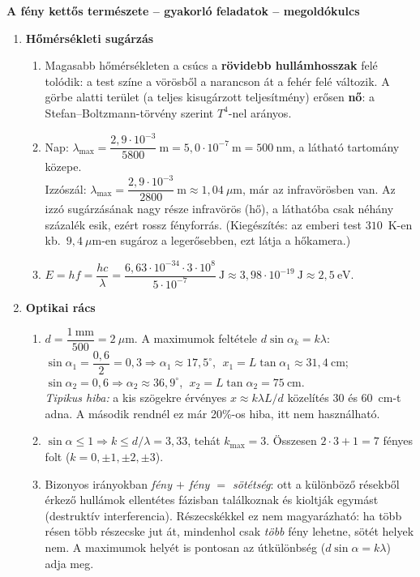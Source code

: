 \documentclass[11pt,a4paper]{article}
\begin{document}
\begin{center}
  {\Large\bfseries A fény kettős természete -- gyakorló feladatok -- megoldókulcs}
\end{center}

\begin{enumerate}
\item \textbf{Hőmérsékleti sugárzás}
  \begin{enumerate}
    \item Magasabb hőmérsékleten a csúcs a \textbf{rövidebb hullámhosszak} felé tolódik:
      a test színe a vörösből a narancson át a fehér felé változik. A görbe alatti
      terület (a teljes kisugárzott teljesítmény) erősen \textbf{nő}: a
      Stefan--Boltzmann-törvény szerint $T^4$-nel arányos.
    \item Nap: $\lambda_\text{max} = \dfrac{2{,}9\cdot 10^{-3}}{5800}~\text{m} =
      5{,}0\cdot 10^{-7}~\text{m} = 500~\text{nm}$, a látható tartomány közepe.\\
      Izzószál: $\lambda_\text{max} = \dfrac{2{,}9\cdot 10^{-3}}{2800}~\text{m} \approx
      1{,}04~\mu\text{m}$, már az infravörösben van. Az izzó sugárzásának nagy része
      infravörös (hő), a láthatóba csak néhány százalék esik, ezért rossz fényforrás.
      (Kiegészítés: az emberi test $310$~K-en kb.\ $9{,}4~\mu\text{m}$-en sugároz a
      legerősebben, ezt látja a hőkamera.)
    \item $E = hf = \dfrac{hc}{\lambda} = \dfrac{6{,}63\cdot 10^{-34}\cdot 3\cdot 10^8}
      {5\cdot 10^{-7}}~\text{J} \approx 3{,}98\cdot 10^{-19}~\text{J} \approx
      2{,}5~\text{eV}$.
  \end{enumerate}

\item \textbf{Optikai rács}
  \begin{enumerate}
    \item $d = \dfrac{1~\text{mm}}{500} = 2~\mu\text{m}$. A maximumok feltétele
      $d\sin\alpha_k = k\lambda$:\\
      $\sin\alpha_1 = \dfrac{0{,}6}{2} = 0{,}3 \Rightarrow \alpha_1 \approx 17{,}5^\circ$,
      $\;x_1 = L\tan\alpha_1 \approx 31{,}4~\text{cm}$;\\
      $\sin\alpha_2 = 0{,}6 \Rightarrow \alpha_2 \approx 36{,}9^\circ$,
      $\;x_2 = L\tan\alpha_2 = 75~\text{cm}$.\\
      \emph{Tipikus hiba:} a kis szögekre érvényes $x \approx k\lambda L/d$ közelítés
      $30$ és $60$~cm-t adna. A második rendnél ez már 20\%-os hiba, itt nem
      használható.
    \item $\sin\alpha \le 1 \Rightarrow k \le d/\lambda = 3{,}33$, tehát $k_\text{max} = 3$.
      Összesen $2\cdot 3 + 1 = 7$ fényes folt ($k = 0, \pm1, \pm2, \pm3$).
    \item Bizonyos irányokban \emph{fény $+$ fény $=$ sötétség}: ott a különböző résekből
      érkező hullámok ellentétes fázisban találkoznak és kioltják egymást (destruktív
      interferencia). Részecskékkel ez nem magyarázható: ha több résen több részecske
      jut át, mindenhol csak \emph{több} fény lehetne, sötét helyek nem. A maximumok
      helyét is pontosan az útkülönbség ($d\sin\alpha = k\lambda$) adja meg.
  \end{enumerate}


\end{enumerate}
\end{document}
